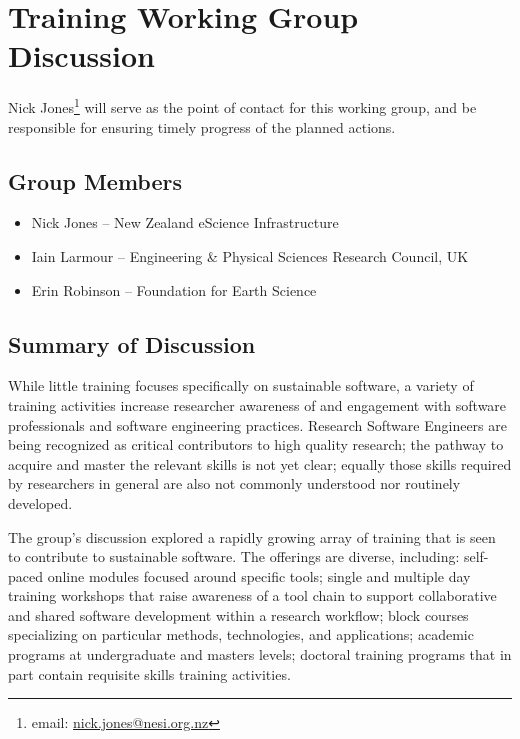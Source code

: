 \section{Training Working Group Discussion}
\label{sec:appendix_training}

Nick Jones\footnote{email:
\href{mailto:nick.jones@nesi.org.nz}{nick.jones@nesi.org.nz}} will serve as the
point of contact for this working group, and be responsible for ensuring timely
progress of the planned actions.

\subsection{Group Members}
\begin{itemize}
\item Nick Jones -- New Zealand eScience Infrastructure
\item Iain Larmour -- Engineering \& Physical Sciences Research Council, UK
\item Erin Robinson -- Foundation for Earth Science
\end{itemize}

\subsection{Summary of Discussion}


While little training focuses specifically on sustainable
software, a variety of training activities increase researcher awareness of
and engagement with software professionals and software engineering practices.
Research Software Engineers are being recognized as critical contributors to
high quality research; the pathway to acquire and master the relevant skills
is not yet clear; equally those skills required by researchers in general are
also not commonly understood nor routinely developed.

The group's discussion explored a rapidly growing array of training that is seen
to contribute to sustainable software. The offerings are diverse, including:
self-paced online modules focused around specific tools; single and multiple day
training workshops that raise awareness of a tool chain to support collaborative
and shared software development within a research workflow; block courses
specializing on particular methods, technologies, and applications; academic
programs at undergraduate and masters levels; doctoral training programs that in
part contain requisite skills training activities.

